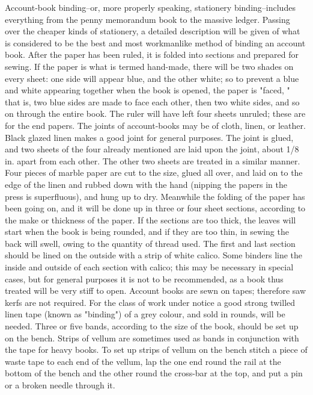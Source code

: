 \documentclass[twoside]{book}
\begin{document}
Account-book binding--or, more properly speaking,
stationery binding--includes everything from
the penny memorandum book to the massive ledger.
Passing over the cheaper kinds of stationery, a
detailed description will be given of what is
considered to be the best and most workmanlike
method of binding an account book. After the
paper has been ruled, it is folded into sections and
prepared for sewing. If the paper is what is termed
hand-made, there will be two shades on every
sheet: one side will appear blue, and the other
white; so to prevent a blue and white appearing
together when the book is opened, the paper is
"faced, " that is, two blue sides are made to face
each other, then two white sides, and so on through
the entire book. The ruler will have left four sheets
unruled; these are for the end papers.
The joints of account-books may be of cloth,
linen, or leather. Black glazed linen makes a good
joint for general purposes. The joint is glued, and
two sheets of the four already mentioned are laid
upon the joint, about 1/8 in. apart from each other.
The other two sheets are treated in a similar
manner. Four pieces of marble paper are cut to the
size, glued all over, and laid on to the edge of the
linen and rubbed down with the hand (nipping the
papers in the press is superfluous), and hung up to
dry. Meanwhile the folding of the paper has been
going on, and it will be done up in three or four
sheet sections, according to the make or thickness
of the paper. If the sections are too thick, the
leaves will start when the book is being rounded,
and if they are too thin, in sewing the back will
swell, owing to the quantity of thread used. The
first and last section should be lined on the outside
with a strip of white calico. Some binders line
\pagebreak
the inside and outside of each section with calico;
this may be necessary in special cases, but for
general purposes it is not to be recommended, as a
book thus treated will be very stiff to open.
Account books are sewn on tapes; therefore saw
kerfs are not required. For the class of work under
notice a good strong twilled linen tape (known as
"binding") of a grey colour, and sold in rounds,
will be needed. Three or five bands, according to
the size of the book, should be set up on the bench.
Strips of vellum are sometimes used as bands in
conjunction with the tape for heavy books. To set
up strips of vellum on the bench stitch a piece of
waste tape to each end of the vellum, lap the one
end round the rail at the bottom of the bench and
the other round the cross-bar at the top, and put a
pin or a broken needle through it.
\end{document}
